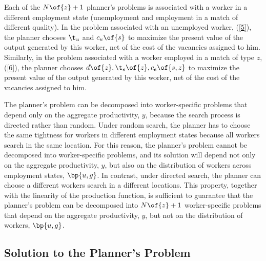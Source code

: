 \documentclass[12pt]{article}
\newcommand{\highlightP}[1]{{\emph{\color{MyPink}{#1}}}}
\theoremstyle{definition}
\begin{document}
Each of the $N\of{z} + 1$ planner's problems is associated with a worker in a different employment state (unemployment and employment in a match of different quality). In the problem associated with an unemployed worker, (\ref{5}), the planner chooses $\t_u$ and $c_u\of{s}$ to maximize the present value of the output generated by this worker, net of the cost of the vacancies assigned to him. Similarly, in the problem associated with a worker employed in a match of type $z$, (\ref{6}), the planner chooses $d\of{z}, \t_e\of{z}, c_e\of{s, z}$ to maximize the present value of the output generated by this worker, net of the cost of the vacancies assigned to him. \highlightP{Since each of these worker-specific problems depends only on the aggregate productivity, $y$, solving the planner's problem in our model is just as easy as solving the planner's problem in a representative agent model.}

The planner's problem can be decomposed into worker-specific problems that depend only on the aggregate productivity, $y$, because the search process is directed rather than random. Under random search, the planner has to choose the same tightness for workers in different employment states because all workers search in the same location. For this reason, the planner's problem cannot be decomposed into worker-specific problems, and its solution will depend not only on the aggregate productivity, $y$, but also on the distribution of workers across employment states, $\bp{u, g}$. In contrast, under directed search, the planner can choose a different workers search in a different locations. This property, together with the linearity of the production function, is sufficient to guarantee that the planner's problem can be decomposed into $N\of{z} + 1$ worker-specific problems that depend on the aggregate productivity, $y$, but not on the distribution of workers, $\bp{u,g}$. 

\subsection{Solution to the Planner's Problem}
\end{document}
